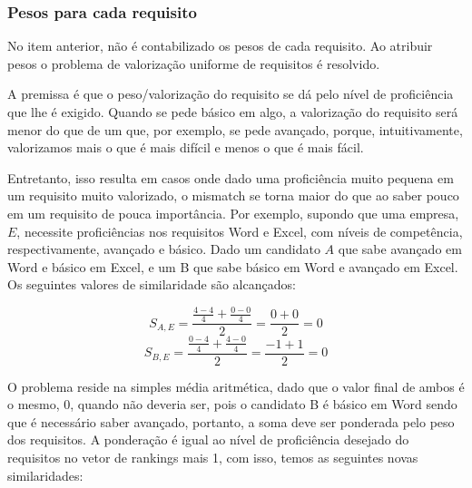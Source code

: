 \documentclass[preprint,12pt]{elsarticle}
\begin{document}
\subsubsection{Pesos para cada requisito}
\label{sssec:weights}
No item anterior, não é contabilizado os pesos de cada requisito. Ao atribuir pesos o problema de valorização uniforme de requisitos é resolvido.

   
A premissa é que o peso/valorização do requisito se dá pelo nível de proficiência que lhe é exigido. Quando se pede básico em algo, a valorização do requisito será menor do que de um que, por exemplo, se pede avançado, porque, intuitivamente, valorizamos mais o que é mais difícil e menos o que é mais fácil.

Entretanto, isso resulta em casos onde dado uma proficiência muito pequena em um requisito muito valorizado, o mismatch se torna maior do que ao saber pouco em um requisito de pouca importância. Por exemplo, supondo que uma empresa, $E$, necessite proficiências nos requisitos Word e Excel, com níveis de competência, respectivamente, avançado e básico. Dado um candidato $A$ que sabe avançado em Word e básico em Excel, e um B que sabe básico em Word e avançado em Excel. Os seguintes valores de similaridade são alcançados:

$$ S_{A,E} = \frac{\tfrac{4 - 4}{4} + \tfrac{0 - 0}{4}}{2} = \frac{0 + 0}{2} =  0 $$
$$ S_{B,E} = \frac{\tfrac{0 - 4}{4} + \tfrac{4 - 0}{4}}{2} = \frac{-1 + 1}{2} =  0 $$

O problema reside na simples média aritmética, dado que o valor final de ambos é o mesmo, 0, quando não deveria ser, pois o candidato B é básico em Word sendo que é necessário saber avançado, portanto, a soma deve ser ponderada pelo peso dos requisitos. A ponderação é igual ao nível de proficiência desejado do requisitos no vetor de rankings mais 1, com isso, temos as seguintes novas similaridades:
\end{document}
